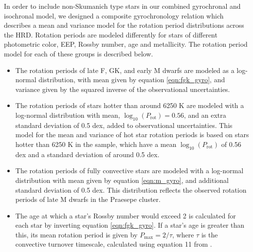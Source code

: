 {In order to include non-Skumanich type stars in our combined gyrochronal and
isochronal model, we designed a composite gyrochronology relation which
describes a mean and variance model for the rotation period distributions
across the HRD.
Rotation periods are modeled differently for stars of different photometric
color, EEP, Rossby number, age and metallicity.
The rotation period model for each of these groups is described below.
\begin{itemize}
    \item{The rotation periods of late F, GK, and early M dwarfs are modeled
        as a log-normal distribution, with mean given by equation
        \ref{eqn:fgk_gyro}, and variance given by the squared inverse of the
        observational uncertainties.}
    \item{The rotation periods of stars hotter than around 6250 K are
        modeled with a log-normal distribution with mean,
        $\log_{10}(P_\mathrm{rot})=0.56$, and an extra standard deviation
        of 0.5 dex, added to observational uncertainties.
        This model for the mean and variance of hot star rotation periods is
        based on stars hotter than 6250 K in the \citet{mcquillan2014} sample,
        which have a mean $\log_{10}(P_\mathrm{rot})$ of 0.56 dex and a
        standard deviation of around 0.5 dex.}
    \item{The rotation periods of fully convective stars are modeled with a
         log-normal distribution with mean given by equation \ref{eqn:m_gyro},
         and additional standard deviation of 0.5 dex.
         This distribution reflects the observed rotation periods  of late M
        dwarfs in the Praesepe cluster.}
    \item{The age at which a star's Rossby number would exceed 2 is calculated
        for each star by inverting equation \ref{eqn:fgk_gyro}.
        If a star's age is greater than this, its mean rotation period is
        given by $P_\mathrm{max} = 2/\tau$, where $\tau$ is the convective
        turnover timescale, calculated using equation 11 from
        \citet{wright2011}.}

\end{itemize}}
